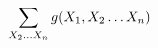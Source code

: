 \documentclass[preview]{standalone}
\begin{document}
\begin{align*}
\special{dvisvgm:raw <g id='unique000'>}\sum_{X_2\ldots X_n} g(X_1, X_2\ldots X_n)\special{dvisvgm:raw </g>}
\end{align*}
\end{document}
